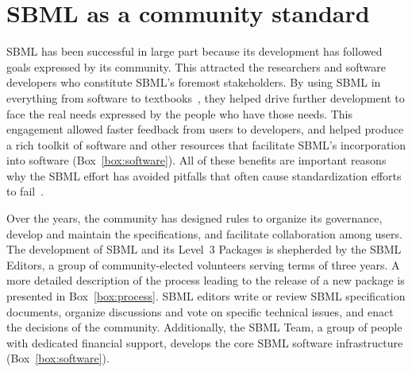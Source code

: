 \documentclass[]{draft-sbml-paper}
\begin{document}
\hrulefill

\newpage
\section*{SBML as a community standard}


SBML has been successful in large part because its development has followed goals expressed by its community.  This attracted the researchers and software developers who constitute SBML's foremost stakeholders.  By using SBML in everything from software to textbooks~\citep[e.g.,][]{Cesario2011cancer, Sullivan2012introduction, Wilkinson2018stochastic, Klipp2016systems, Choi2010systems, Jack2009discrete, Govindjee2009photosynthesis, Liu2009systems, Choi2008introduction}, they helped drive further development to face the real needs expressed by the people who have those needs.  This engagement allowed faster feedback from users to developers, and helped produce a rich toolkit of software and other resources that facilitate SBML's incorporation into software (Box~\ref{box:software}).  All of these benefits are important reasons why the SBML effort has avoided pitfalls that often cause standardization efforts to fail~\citep{Cargill2011why}.

Over the years, the community has designed rules to organize its governance, develop and maintain the specifications, and facilitate collaboration among users.  The development of SBML and its Level~3 Packages is shepherded by the SBML Editors, a group of community-elected volunteers serving terms of three years. A more detailed description of the process leading to the release of a new package is presented in Box~\ref{box:process}. SBML editors write or review SBML specification documents, organize discussions and vote on specific technical issues, and enact the decisions of the community. Additionally, the SBML Team, a group of people with dedicated financial support, develops the core SBML software infrastructure (Box~\ref{box:software}).
\end{document}
